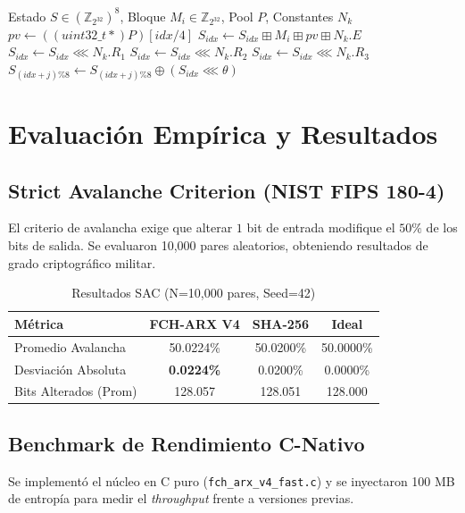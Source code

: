 \documentclass[10pt,twocolumn,letterpaper]{article}
\begin{document}
\begin{algorithm}
\caption{Función de Compresión ARX (Word-Level)}
\begin{algorithmic}[1]
\REQUIRE Estado $S \in (\mathbb{Z}_{2^{32}})^8$, Bloque $M_i \in \mathbb{Z}_{2^{32}}$, Pool $P$, Constantes $N_k$
\STATE $pv \leftarrow ((uint32\_t*)P)[idx / 4]$  
\STATE $S_{idx} \leftarrow S_{idx} \boxplus M_i \boxplus pv \boxplus N_k.E$ 
\STATE $S_{idx} \leftarrow S_{idx} \lll N_k.R_1$ 
\STATE $S_{idx} \leftarrow S_{idx} \lll N_k.R_2$ 
\STATE $S_{idx} \leftarrow S_{idx} \lll N_k.R_3$ 
    \STATE $S_{(idx+j)\%8} \leftarrow S_{(idx+j)\%8} \oplus (S_{idx} \lll \theta)$ 
\ENDFOR
\end{algorithmic}
\end{algorithm}

\section{Evaluación Empírica y Resultados}

\subsection{Strict Avalanche Criterion (NIST FIPS 180-4)}
El criterio de avalancha exige que alterar $1$ bit de entrada modifique el $50\%$ de los bits de salida. Se evaluaron 10,000 pares aleatorios, obteniendo resultados de grado criptográfico militar.

\begin{table}[h]
\centering
\caption{Resultados SAC (N=10,000 pares, Seed=42)}
\label{tab:sac}
\begin{tabular}{@{}lccc@{}}
\toprule
\textbf{Métrica} & \textbf{FCH-ARX V4} & \textbf{SHA-256} & \textbf{Ideal} \\ \midrule
Promedio Avalancha & 50.0224\% & 50.0200\% & 50.0000\% \\
Desviación Absoluta & \textbf{0.0224\%} & 0.0200\% & 0.0000\% \\
Bits Alterados (Prom) & 128.057 & 128.051 & 128.000 \\ \bottomrule
\end{tabular}
\end{table}

\subsection{Benchmark de Rendimiento C-Nativo}
Se implementó el núcleo en C puro (\texttt{fch\_arx\_v4\_fast.c}) y se inyectaron 100 MB de entropía para medir el \textit{throughput} frente a versiones previas.
\end{document}
